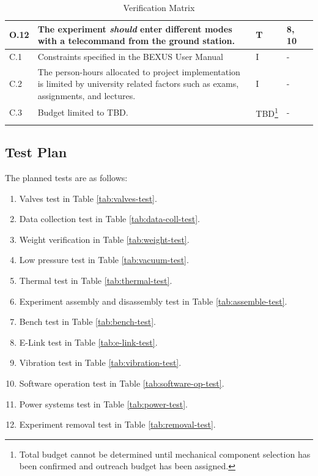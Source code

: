 \documentclass[a4paper,12pt,twoside]{article}
\begin{document}
\begin{longtable}[]{|m{}| m{} |m{} |m{}|m{}|}
O.12 & The experiment \textit{should} enter different modes with a telecommand from the ground station.                                                                      &      T        & 8, 10            &        \\ \hline
C.1  & Constraints specified in the BEXUS User Manual                                                                                                                          &       I       & -            &        \\ \hline
C.2  & The person-hours allocated to project implementation is limited by university related factors such as exams, assignments, and lectures.                                 &      I        & -            &        \\ \hline
C.3  & Budget limited to TBD.                                                                                                                                                  &      TBD\footnote{Total budget cannot be determined until mechanical component selection has been confirmed and outreach budget has been assigned.}        & -            &        \\ \hline

\caption{Verification Matrix}
\label{tab:var-mat}
\end{longtable}
\raggedbottom
\pagebreak
\subsection{Test Plan}

The planned tests are as follows:

\begin{enumerate}
    \item Valves test in Table \ref{tab:valves-test}.
    \item Data collection test in Table \ref{tab:data-coll-test}.
    \item Weight verification in Table \ref{tab:weight-test}.
    \item Low pressure test in Table \ref{tab:vacuum-test}.
    \item Thermal test in Table \ref{tab:thermal-test}.
    \item Experiment assembly and disassembly test in Table \ref{tab:assemble-test}.
    \item Bench test in Table \ref{tab:bench-test}.
    \item E-Link test in Table \ref{tab:e-link-test}.
    \item Vibration test in Table \ref{tab:vibration-test}.
    \item Software operation test in Table \ref{tab:software-op-test}.
    \item Power systems test in Table \ref{tab:power-test}.
    \item Experiment removal test in Table \ref{tab:removal-test}.
\end{enumerate}
\end{document}
